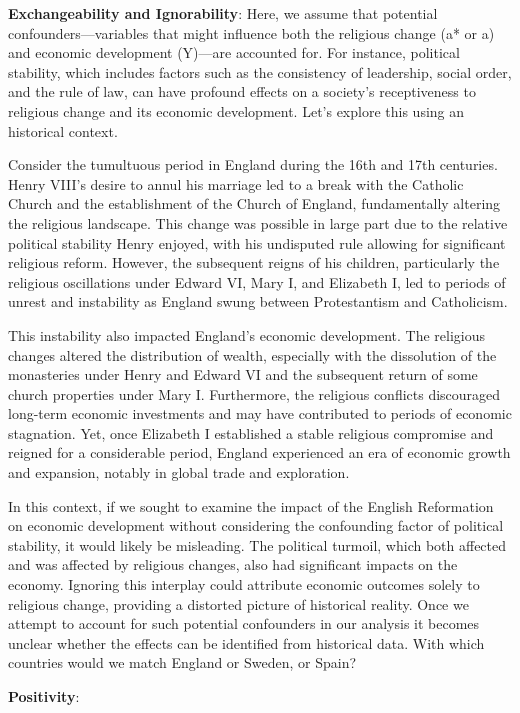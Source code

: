 \documentclass[
  singlecolumn]{report}
\begin{document}
\textbf{Exchangeability and Ignorability}: Here, we assume that
potential confounders---variables that might influence both the
religious change (a* or a) and economic development (Y)---are accounted
for. For instance, political stability, which includes factors such as
the consistency of leadership, social order, and the rule of law, can
have profound effects on a society's receptiveness to religious change
and its economic development. Let's explore this using an historical
context.

Consider the tumultuous period in England during the 16th and 17th
centuries. Henry VIII's desire to annul his marriage led to a break with
the Catholic Church and the establishment of the Church of England,
fundamentally altering the religious landscape. This change was possible
in large part due to the relative political stability Henry enjoyed,
with his undisputed rule allowing for significant religious reform.
However, the subsequent reigns of his children, particularly the
religious oscillations under Edward VI, Mary I, and Elizabeth I, led to
periods of unrest and instability as England swung between Protestantism
and Catholicism.

This instability also impacted England's economic development. The
religious changes altered the distribution of wealth, especially with
the dissolution of the monasteries under Henry and Edward VI and the
subsequent return of some church properties under Mary I. Furthermore,
the religious conflicts discouraged long-term economic investments and
may have contributed to periods of economic stagnation. Yet, once
Elizabeth I established a stable religious compromise and reigned for a
considerable period, England experienced an era of economic growth and
expansion, notably in global trade and exploration.

In this context, if we sought to examine the impact of the English
Reformation on economic development without considering the confounding
factor of political stability, it would likely be misleading. The
political turmoil, which both affected and was affected by religious
changes, also had significant impacts on the economy. Ignoring this
interplay could attribute economic outcomes solely to religious change,
providing a distorted picture of historical reality. Once we attempt to
account for such potential confounders in our analysis it becomes
unclear whether the effects can be identified from historical data. With
which countries would we match England or Sweden, or Spain?

\textbf{Positivity}:
\end{document}
